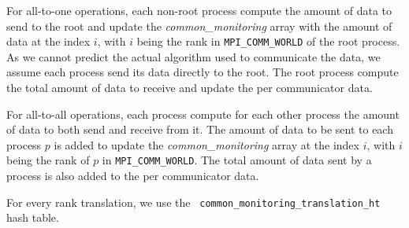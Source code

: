 \documentclass[notitlepage]{article}
\newcommand{\brkunds}[0]{\allowbreak\_}
\begin{document}
For all-to-one operations, each non-root process compute the amount of
data to send to the root and update the {\it common\brkunds{}monitoring}
array with the amount of data at the index $i$, with $i$ being the
rank in {\tt MPI\brkunds{}COMM\brkunds{}WORLD} of the root process. As
we cannot predict the actual algorithm used to communicate the data,
we assume each process send its data directly to the root. The root
process compute the total amount of data to receive and update the per
communicator data.

For all-to-all operations, each process compute for each other process
the amount of data to both send and receive from it. The amount of
data to be sent to each process $p$ is added to update the {\it
  common\brkunds{}monitoring} array at the index $i$, with $i$ being
the rank of $p$ in {\tt MPI\brkunds{}COMM\brkunds{}WORLD}. The total
amount of data sent by a process is also added to the per communicator
data.

For every rank translation, we use the {\tt
  common\brkunds{}monitoring\brkunds{}translation\brkunds{}ht} hash
table.
\end{document}

